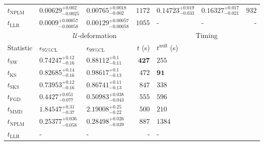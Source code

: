 \begin{tabular}{l|llr|llr}
\rowcolor{red!35}	$t_{\mathrm{NPLM}}$ & $0.00629_{-0.0025}^{+0.002}$ & $0.00765_{-0.002}^{+0.0018}$ & $1172$ & $0.14723_{-0.033}^{+0.019}$ & $0.16327_{-0.021}^{+0.017}$ & $932$ \\
	$t_{\mathrm{LLR}}$ & $0.0009_{-0.00058}^{+0.00057}$ & $0.00129_{-0.00058}^{+0.00057}$ & $1055$ & - & - & - \\
	\toprule
	\multicolumn{1}{c}{} & \multicolumn{3}{c}{$\mathcal{U}$-deformation} & \multicolumn{3}{c}{Timing} \\
	Statistic & $\epsilon_{95\%\mathrm{CL}}$ & $\epsilon_{99\%\mathrm{CL}}$ & $t$ (s) & $t^{\mathrm{null}}$ (s) \\
	\midrule
	$t_{\mathrm{SW}}$ & $0.74247_{-0.16}^{+0.12}$ & $0.88112_{-0.11}^{+0.1}$ & ${\mathbf{427}}$ & $255$ \\
	$t_{\overline{\mathrm{KS}}}$ & $0.82685_{-0.16}^{+0.14}$ & $0.98617_{-0.13}^{+0.1}$ & $472$ & ${\mathbf{91}}$ \\
	$t_{\mathrm{SKS}}$ & $0.73953_{-0.16}^{+0.12}$ & $0.86741_{-0.13}^{+0.11}$ & $847$ & $338$ \\
	$t_{\mathrm{FGD}}$ & ${\mathbf{0.4427_{-0.077}^{+0.051}}}$ & ${\mathbf{0.50983_{-0.043}^{+0.038}}}$ & $555$ & $596$ \\
	$t_{\mathrm{MMD}}$ & $1.84547_{-0.37}^{+0.31}$ & $2.19008_{-0.22}^{+0.25}$ & $500$ & $210$ \\
\rowcolor{red!35}	$t_{\mathrm{NPLM}}$ & $0.25377_{-0.058}^{+0.036}$ & $0.28498_{-0.039}^{+0.026}$ & $887$ & $1384$ \\
	$t_{\mathrm{LLR}}$ & - & - & - & - \\
	\bottomrule
\end{tabular}